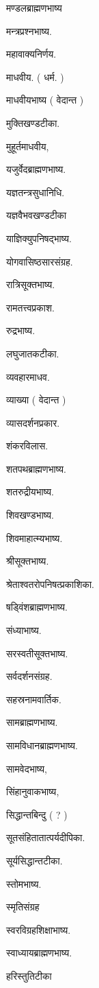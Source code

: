 \documentclass[11pt, openany]{book}
\begin{document}
\begin{multicols}{2}
मण्डलब्राह्मणभाष्य 

\columnbreak

मन्त्रप्रश्नभाष्य. 

महावाक्यनिर्णय. 

माधवीय. ( धर्म. ) 

माधवीयभाष्य ( वेदान्त ) 

मुक्तिखण्डटीका. 

मुहूर्तमाधवीय, 

यजुर्वेदब्राह्मणभाष्य. 

यज्ञतन्त्रसुधानिधि. 

यज्ञवैभवखण्डटीका 

याज्ञिक्युपनिषद्भाष्य. 

योगवासिष्ठसारसंग्रह. 

रात्रिसूक्तभाष्य. 

रामतत्त्वप्रकाश. 

रुद्रभाष्य. 

लघुजातकटीका. 

व्यवहारमाधव. 

व्याख्या ( वेदान्त ) 

व्यासदर्शनप्रकार. 

शंकरविलास. 

शतपथब्राह्मणभाष्य. 

शतरुद्रीयभाष्य. 

शिवखण्डभाष्य. 

शिवमाहात्म्यभाष्य. 

श्रीसूक्तभाष्य. 

श्रेताश्वतरोपनिषत्प्रकाशिका. 

षड्विंशब्राह्मणभाष्य. 

संध्याभाष्य. 

सरस्वतीसूक्तभाष्य. 

सर्वदर्शनसंग्रह. 

सहस्रनामवार्तिक. 

सामब्राह्मणभाष्य. 

सामविधानब्राह्मणभाष्य. 

सामवेदभाष्य, 

सिंहानुवाकभाष्य, 

सिद्धान्तबिन्दु ( ? ) 

सूतसंहितातात्पर्यदीपिका. 

सूर्यसिद्धान्तटीका. 

स्तोमभाष्य. 

स्मृतिसंग्रह 

स्वरविग्रहशिक्षाभाष्य. 

स्वाध्यायब्राह्मणभाष्य. 

हरिस्तुतिटीका
\end{multicols}
\end{document}
